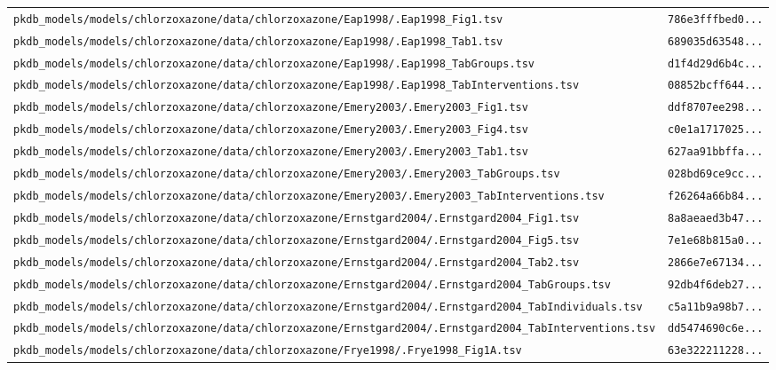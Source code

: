 \begin{longtable}{ll}
\texttt{pkdb\_models/models/chlorzoxazone/data/chlorzoxazone/Eap1998/.Eap1998\_Fig1.tsv} & \texttt{786e3fffbed0...} \\
\texttt{pkdb\_models/models/chlorzoxazone/data/chlorzoxazone/Eap1998/.Eap1998\_Tab1.tsv} & \texttt{689035d63548...} \\
\texttt{pkdb\_models/models/chlorzoxazone/data/chlorzoxazone/Eap1998/.Eap1998\_TabGroups.tsv} & \texttt{d1f4d29d6b4c...} \\
\texttt{pkdb\_models/models/chlorzoxazone/data/chlorzoxazone/Eap1998/.Eap1998\_TabInterventions.tsv} & \texttt{08852bcff644...} \\
\texttt{pkdb\_models/models/chlorzoxazone/data/chlorzoxazone/Emery2003/.Emery2003\_Fig1.tsv} & \texttt{ddf8707ee298...} \\
\texttt{pkdb\_models/models/chlorzoxazone/data/chlorzoxazone/Emery2003/.Emery2003\_Fig4.tsv} & \texttt{c0e1a1717025...} \\
\texttt{pkdb\_models/models/chlorzoxazone/data/chlorzoxazone/Emery2003/.Emery2003\_Tab1.tsv} & \texttt{627aa91bbffa...} \\
\texttt{pkdb\_models/models/chlorzoxazone/data/chlorzoxazone/Emery2003/.Emery2003\_TabGroups.tsv} & \texttt{028bd69ce9cc...} \\
\texttt{pkdb\_models/models/chlorzoxazone/data/chlorzoxazone/Emery2003/.Emery2003\_TabInterventions.tsv} & \texttt{f26264a66b84...} \\
\texttt{pkdb\_models/models/chlorzoxazone/data/chlorzoxazone/Ernstgard2004/.Ernstgard2004\_Fig1.tsv} & \texttt{8a8aeaed3b47...} \\
\texttt{pkdb\_models/models/chlorzoxazone/data/chlorzoxazone/Ernstgard2004/.Ernstgard2004\_Fig5.tsv} & \texttt{7e1e68b815a0...} \\
\texttt{pkdb\_models/models/chlorzoxazone/data/chlorzoxazone/Ernstgard2004/.Ernstgard2004\_Tab2.tsv} & \texttt{2866e7e67134...} \\
\texttt{pkdb\_models/models/chlorzoxazone/data/chlorzoxazone/Ernstgard2004/.Ernstgard2004\_TabGroups.tsv} & \texttt{92db4f6deb27...} \\
\texttt{pkdb\_models/models/chlorzoxazone/data/chlorzoxazone/Ernstgard2004/.Ernstgard2004\_TabIndividuals.tsv} & \texttt{c5a11b9a98b7...} \\
\texttt{pkdb\_models/models/chlorzoxazone/data/chlorzoxazone/Ernstgard2004/.Ernstgard2004\_TabInterventions.tsv} & \texttt{dd5474690c6e...} \\
\texttt{pkdb\_models/models/chlorzoxazone/data/chlorzoxazone/Frye1998/.Frye1998\_Fig1A.tsv} & \texttt{63e322211228...} \\

\end{longtable}
